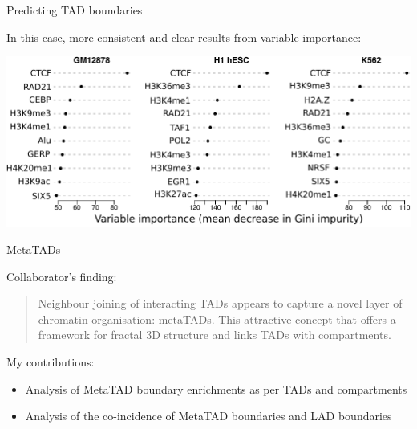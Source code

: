\documentclass{beamer}
\begin{document}
\begin{frame}{Predicting TAD boundaries}

In this case, more consistent and clear results from variable importance:

\vspace{2em}

\centering
\includegraphics[width=\textwidth]{../figs/tadpred_varimp.pdf}

\end{frame}


\begin{frame}{MetaTADs}

Collaborator's finding: \\
\begin{quote}
Neighbour joining of interacting TADs appears to 
capture a novel layer of chromatin organisation: metaTADs. This attractive
concept that offers a framework for fractal 3D structure and links TADs with compartments.
 \end{quote}

\vspace{2em}

My contributions: \\
\begin{itemize}
\item Analysis of MetaTAD boundary enrichments as per TADs and compartments
\item Analysis of the co-incidence of MetaTAD boundaries and LAD boundaries
\end{itemize}

\vspace{2em}

\end{frame}
\end{document}
